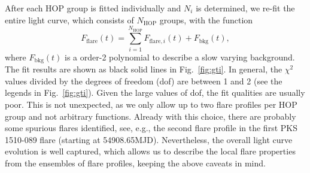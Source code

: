 \documentclass[twocolumn,linenumbers]{aastex62}
\begin{document}
After each HOP group is fitted individually and $N_i$ is determined, 
we re-fit the entire light curve, which consists of $N_\mathrm{HOP}$ groups, with the function 
\begin{equation}
    F_\mathrm{flare}(t) = \sum\limits_{i = 1}^{N_\mathrm{HOP}}F_{\mathrm{flare},i}(t) + F_\mathrm{bkg}(t),
\end{equation}
where $F_\mathrm{bkg}(t)$ is a order-2 polynomial to describe a slow  varying background.
The fit results are shown as black solid lines in Fig.~\ref{fig:gti}.
In general, the $\chi^2$ values divided by the degrees of freedom (dof) are between 1 and 2 (see the legends in Fig.~\ref{fig:gti}). Given the large values of dof, the fit qualities are usually poor. This is not unexpected, as we only allow up to two flare profiles per HOP group and not arbitrary functions. Already with this choice, there are probably some spurious flares identified, see, e.g., the second flare profile in the first PKS\,1510-089 flare (starting at 54908.65MJD). 
Nevertheless, the overall light curve evolution is well captured, which allows us to describe the local flare properties from the ensembles of flare profiles, keeping the above caveats in mind. 
\end{document}
